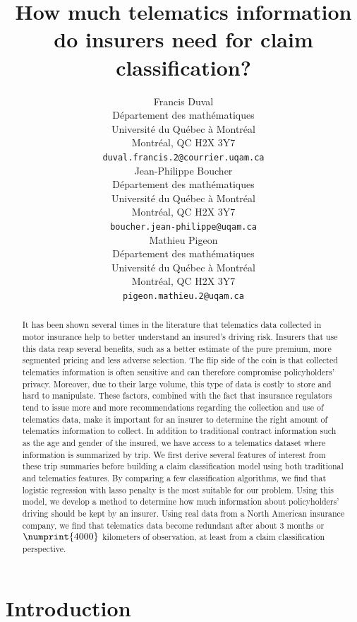 \documentclass{article}
\title{How much telematics information do insurers need for claim classification?}
\author{
    Francis Duval \\
    Département des mathématiques\\
    Université du Québec à Montréal\\
    Montréal, QC H2X 3Y7\\
    \texttt{duval.francis.2@courrier.uqam.ca} \\
    \And
    Jean-Philippe Boucher\\
    Département des mathématiques\\
    Université du Québec à Montréal\\
    Montréal, QC H2X 3Y7\\
    \texttt{boucher.jean-philippe@uqam.ca} \\
    \And
    Mathieu Pigeon\\
    Département des mathématiques\\
    Université du Québec à Montréal\\
    Montréal, QC H2X 3Y7\\
    \texttt{pigeon.mathieu.2@uqam.ca} \\
}
\begin{document}
\maketitle

\begin{abstract}
    It has been shown several times in the literature that telematics data collected in motor insurance help to better understand an insured's driving risk. Insurers that use this data reap several benefits, such as a better estimate of the pure premium, more segmented pricing and less adverse selection. The flip side of the coin is that collected telematics information is often sensitive and can therefore compromise policyholders' privacy. Moreover, due to their large volume, this type of data is costly to store and hard to manipulate. These factors, combined with the fact that insurance regulators tend to issue more and more recommendations regarding the collection and use of telematics data, make it important for an insurer to determine the right amount of telematics information to collect. In addition to traditional contract information such as the age and gender of the insured, we have access to a telematics dataset where information is summarized by trip. We first derive several features of interest from these trip summaries before building a claim classification model using both traditional and telematics features. By comparing a few classification algorithms, we find that logistic regression with lasso penalty is the most suitable for our problem. Using this model, we develop a method to determine how much information about policyholders' driving should be kept by an insurer. Using real data from a North American insurance company, we find that telematics data become redundant after about $3$ months or $\numprint{4000}$ kilometers of observation, at least from a claim classification perspective.
\end{abstract}


\section{Introduction}\label{sec:intro}
\end{document}
